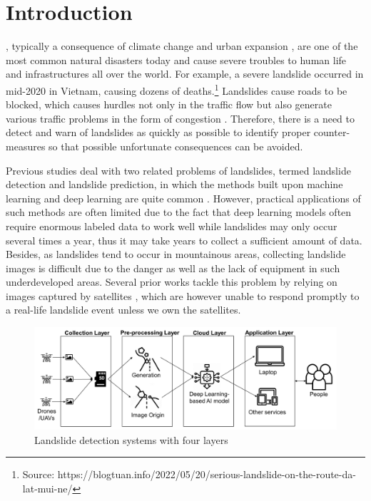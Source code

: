 \documentclass{ieeeaccess}
\begin{document}
\titlepgskip=-15pt

\maketitle
\begingroup\renewcommand\thefootnote{\textsection}
\endgroup

\section{Introduction}
\label{sec:introduction}

, typically a consequence of climate change \cite{Bourenane2021} and urban expansion \cite{Picarelli2021}, are one of the most common natural disasters today and cause severe troubles to human life and infrastructures all over the world. For example, a severe landslide occurred in mid-2020 in Vietnam, causing dozens of deaths.\footnote{Source: https://blogtuan.info/2022/05/20/serious-landslide-on-the-route-da-lat-mui-ne/} Landslides cause roads to be blocked, which causes hurdles not only in the traffic flow but also generate various traffic problems in the form of congestion \cite{Hung2015}.   Therefore, there is a need to detect and warn of landslides as quickly as possible to identify proper counter-measures so that possible unfortunate consequences can be avoided. 

Previous studies deal with two related problems of landslides, termed landslide detection and landslide prediction, in which the methods built upon machine learning and deep learning are quite common \cite{Ma2021, Tehrani2022}. However, practical applications of such methods are often limited due to the fact that deep learning models often require enormous labeled data to work well while landslides may only occur several times a year, thus it may take years to collect a sufficient amount of data. Besides, as landslides tend to occur in mountainous areas, collecting landslide images is difficult due to the danger as well as the lack of equipment in such underdeveloped areas. Several prior works tackle this problem by relying on images captured by satellites \cite{Prakash2021, Ghorbanzadeh2021}, which are however unable to respond promptly to a real-life landslide event unless we own the satellites.



\begin{figure}[t]
  \centering
  \includegraphics[width=\textwidth]{Fig/overview-system-landslide.png}
  \caption{Landslide detection systems with four layers}
  \label{fig-system}
\end{figure}
\end{document}
